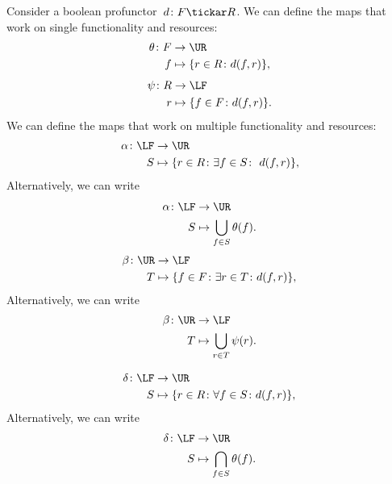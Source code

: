 Consider a boolean profunctor~$d\colon F\tickar R$. We can define the maps that work on single functionality and resources:
%
\begin{equation}
    \begin{aligned}
        \theta\colon F&\to \UR\\
        f&\mapsto \{r\in R \colon d(f, r) \},
    \end{aligned}
\end{equation}
%
\begin{equation}
    \begin{aligned}
        \psi\colon R&\to \LF\\
        r&\mapsto \{f\in F \colon d(f, r) \}.
    \end{aligned}
\end{equation}
We can define the maps that work on multiple functionality
and resources:
\begin{equation}
    \label{eq:galoisalfa}
    \begin{aligned}
        \alpha\colon \LF&\to \UR\\
        S&\mapsto \{r\in R \colon \exists f\in S\colon \ d(f,r)\},
    \end{aligned}
\end{equation}
Alternatively, we can write
\begin{equation}
    \begin{aligned}
        \alpha \colon \LF &\to \UR \\
        S&\mapsto \bigcup_{f\in S} \theta(f).
    \end{aligned}
\end{equation}
%
\begin{equation}
    \label{eq:galoisbeta}
    \begin{aligned}
        \beta\colon \UR&\to \LF\\
        T&\mapsto \{f\in F  \colon \exists r\in T\colon d(f,r)\},
    \end{aligned}
\end{equation}
%
\noindent Alternatively, we can write
\begin{equation}
    \begin{aligned}
        \beta \colon \UR &\to \LF \\
        T&\mapsto \bigcup_{r\in T} \psi(r).
    \end{aligned}
\end{equation}

\begin{equation}
    \label{eq:galoisdelta}
    \begin{aligned}
        \delta \colon \LF&\to \UR\\
        S&\mapsto \{r\in R \colon \forall {f\in S}\colon d(f,r)\},
    \end{aligned}
\end{equation}
Alternatively, we can write
\begin{equation}
    \begin{aligned}
        \delta\colon \LF &\to \UR\\
        S&\mapsto \bigcap_{f\in S}\theta(f).
    \end{aligned}
\end{equation}

